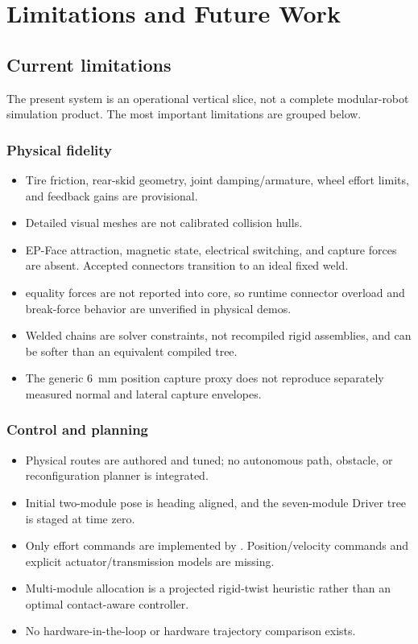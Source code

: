 \section{Limitations and Future Work}
\label{sec:future}

\subsection{Current limitations}

The present system is an operational vertical slice, not a complete modular-robot
simulation product. The most important limitations are grouped below.

\subsubsection{Physical fidelity}

\begin{itemize}
  \item Tire friction, rear-skid geometry, joint damping/armature, wheel effort limits,
        and feedback gains are provisional.
  \item Detailed visual meshes are not calibrated collision hulls.
  \item EP-Face attraction, magnetic state, electrical switching, and capture forces are
        absent. Accepted connectors transition to an ideal fixed weld.
  \item \mujoco{} equality forces are not reported into core, so runtime connector
        overload and break-force behavior are unverified in physical demos.
  \item Welded chains are solver constraints, not recompiled rigid assemblies, and can
        be softer than an equivalent compiled tree.
  \item The generic \SI{6}{mm} position capture proxy does not reproduce separately
        measured normal and lateral capture envelopes.
\end{itemize}

\subsubsection{Control and planning}

\begin{itemize}
  \item Physical routes are authored and tuned; no autonomous path, obstacle, or
        reconfiguration planner is integrated.
  \item Initial two-module pose is heading aligned, and the seven-module Driver tree is
        staged at time zero.
  \item Only effort commands are implemented by \mujoco{}. Position/velocity commands
        and explicit actuator/transmission models are missing.
  \item Multi-module allocation is a projected rigid-twist heuristic rather than an
        optimal contact-aware controller.
  \item No hardware-in-the-loop or hardware trajectory comparison exists.
\end{itemize}

